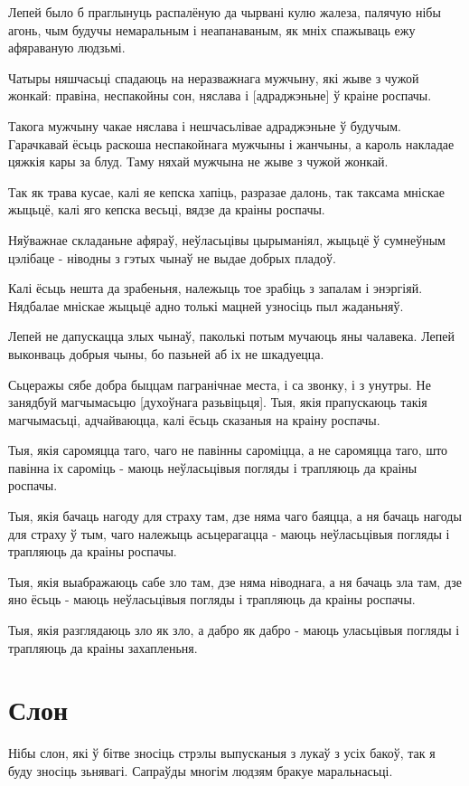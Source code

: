 \documentclass{article}
\begin{document}
Лепей было б праглынуць распалёную да чырвані кулю жалеза, палячую
нібы агонь, чым будучы немаральным і неапанаваным, як мніх спажываць ежу
афяраваную людзьмі.

Чатыры няшчасьці спадаюць на неразважнага мужчыну, які жыве з чужой
жонкай: правіна, неспакойны сон, няслава і {[}адраджэньне{]} ў краіне
роспачы.

Такога мужчыну чакае няслава і нешчасьлівае адраджэньне ў будучым.
Гарачкавай ёсьць раскоша неспакойнага мужчыны і жанчыны, а кароль
накладае цяжкія кары за блуд. Таму няхай мужчына не жыве з чужой жонкай.

Так як трава кусае, калі яе кепска хапіць, разразае далонь, так
таксама мніскае жыцьцё, калі яго кепска весьці, вядзе да краіны роспачы.

Няўважнае складаньне афяраў, неўласьцівы цырыманіял, жыцьцё ў
сумнеўным цэлібаце - ніводны з гэтых чынаў не выдае добрых пладоў.

Калі ёсьць нешта да зрабеньня, належыць тое зрабіць з запалам і
энэргіяй. Нядбалае мніскае жыцьцё адно толькі мацней узносіць пыл
жаданьняў.

Лепей не дапускацца злых чынаў, паколькі потым мучаюць яны
чалавека. Лепей выконваць добрыя чыны, бо пазьней аб іх не шкадуецца.

Сьцеражы сябе добра быццам пагранічнае места, і са звонку, і з
унутры. Не занядбуй магчымасьцю {[}духоўнага разьвіцьця{]}. Тыя, якія
прапускаюць такія магчымасьці, адчайваюцца, калі ёсьць сказаныя на
краіну роспачы.

Тыя, якія саромяцца таго, чаго не павінны сароміцца, а не саромяцца
таго, што павінна іх сароміць - маюць неўласьцівыя погляды і трапляюць
да краіны роспачы.

Тыя, якія бачаць нагоду для страху там, дзе няма чаго баяцца, а ня
бачаць нагоды для страху ў тым, чаго належыць асьцерагацца - маюць
неўласьцівыя погляды і трапляюць да краіны роспачы.

Тыя, якія выабражаюць сабе зло там, дзе няма ніводнага, а ня бачаць
зла там, дзе яно ёсьць - маюць неўласьцівыя погляды і трапляюць да
краіны роспачы.

Тыя, якія разглядаюць зло як зло, а дабро як дабро - маюць
уласьцівыя погляды і трапляюць да краіны захапленьня.

\section{Слон}

Нібы слон, які ў бітве зносіць стрэлы выпусканыя з лукаў з усіх
бакоў, так я буду зносіць зьнявагі. Сапраўды многім людзям бракуе
маральнасьці.
\end{document}
